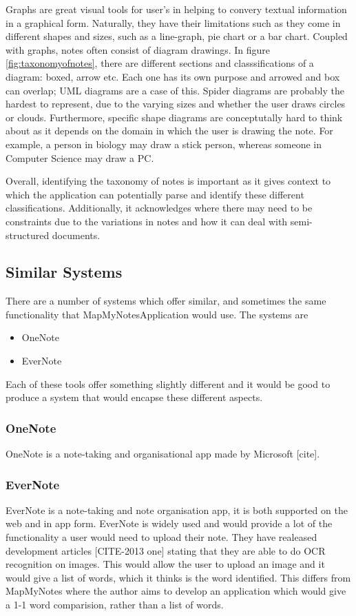 Graphs are great visual tools for user's in helping to convery textual information in a graphical form. Naturally, they have their limitations such as they come in different shapes and sizes, such as a line-graph, pie chart or a bar chart. Coupled with graphs, notes often consist of diagram drawings.  In figure \ref{fig:taxonomyofnotes}, there are different sections and classsifications of a diagram: boxed, arrow etc. Each one has its own purpose and arrowed and box can overlap; UML diagrams are a case of this. Spider diagrams are probably the hardest to represent, due to the varying sizes and whether the user draws circles or clouds. Furthermore, specific shape diagrams are conceptutally hard to think about as it depends on the domain in which the user is drawing the note. For example, a person in biology may draw a stick person, whereas someone in Computer Science may draw a PC. 

Overall, identifying the taxonomy of notes is important as it gives context to which the application can potentially parse and identify these different classifications. Additionally, it acknowledges where there may need to be constraints due to the variations in notes and how it can deal with semi-structured documents.




\subsection{Similar Systems}
There are a number of systems which offer similar, and sometimes the same functionality that MapMyNotesApplication would use. The systems are
\begin{itemize}
  \item OneNote
  \item EverNote
\end{itemize}
Each of these tools offer something slightly different and it would be good to produce a system that would encapse these different aspects.
\subsubsection{OneNote}
OneNote is a note-taking and organisational app made by Microsoft [cite].
\subsubsection{EverNote}
EverNote is a note-taking and note organisation app, it is both supported on the web and in app form. EverNote is widely used and would provide a lot of the functionality a user would need to upload their note. They have realeased development articles [CITE-2013 one] stating that they are able to do OCR recognition on images. This would allow the user to upload an image and it would give a list of words, which it thinks is the word identified. This differs from MapMyNotes where the author aims to develop an application which would give a 1-1 word comparision, rather than a list of words.


